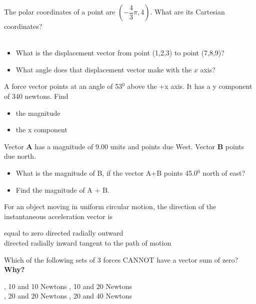 \documentclass[12pt,addpoints]{exam}
\begin{document}
\begin{questions}
		\question The polar coordinates of a point are $(-\dfrac{4}{3}\pi,4)$. What are its Cartesian coordinates?\\ \\ \vspace{2cm}
		\question \begin{itemize}
			\item What is the displacement vector from point (1,2,3) to point (7,8,9)?\vspace{1in}
			\item What angle does that displacement vector make with the $x$ axis?\vspace{1in}
		\end{itemize}
		\question  A force vector points at an angle of 53$^0$ above the +x axis. It has a y
		component of 340 newtons. Find 
		\begin{itemize}
			\item the magnitude \vspace{1in}
			\item the x component \vspace{1in}
		\end{itemize}
		\question  Vector \textbf{A} has a magnitude of 9.00 units and points due West. Vector \textbf{B} points due north. \begin{itemize}
			\item What is the magnitude of B, if the vector A+B points 45.0$^0$ north of east?\vspace{1in} 
			\item Find the magnitude of A + B.\vspace{1in}
		\end{itemize} 
		\question For an object moving in uniform circular motion, the direction of the
		instantaneous acceleration vector is \\
		\begin{oneparchoices}
			\choice equal to zero
			\choice directed radially outward \\
			\choice directed radially inward
			\choice tangent to the path of motion
		\end{oneparchoices}
		\question Which of the following sets of 3 forces CANNOT have a vector sum of zero? \textbf{Why?} \\
		\begin{oneparchoices}
			, 10 and 10 Newtons
			, 10 and 20 Newtons \\
			, 20 and 20 Newtons
			, 20 and 40 Newtons
		\end{oneparchoices}

\end{questions}
\end{document}
